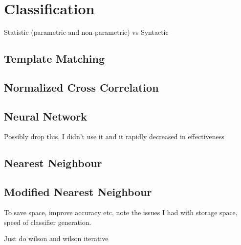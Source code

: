 \section{Classification}

Statistic (parametric and non-parametric) vs Syntactic
\subsection{Template Matching}

\subsection{Normalized Cross Correlation}

\subsection{Neural Network}
Possibly drop this, I didn't use it and it rapidly decreased in effectiveness

\subsection{Nearest Neighbour}

\subsection{Modified Nearest Neighbour}

To save space, improve accuracy etc, note the issues I had with storage space, speed of classifier generation.

Just do wilson and wilson iterative
